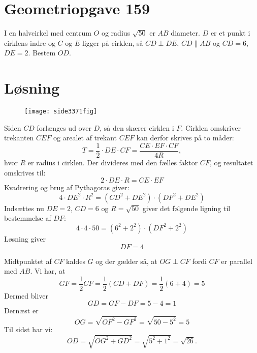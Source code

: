 \documentclass[12pt,oneside,a4paper]{article}
\begin{document}
\section*{Geometriopgave 159}
I en halvcirkel med centrum $O$ og radius $\sqrt{50}$ er $AB$ diameter. $D$ 
er et punkt i cirklens indre og $C$ og $E$ ligger på cirklen, så $CD \perp DE$, $CD \parallel AB$ og $CD=6$, $DE=2$. Bestem $OD$.


\section*{Løsning}
\begin{figure}[ht]
    \centering
    \texttt{[image: side3371fig]}
    \label{side3371fig}
\end{figure}

Siden $CD$ forlænges ud over $D$, så den skærer cirklen i $F$. Cirklen
omskriver trekanten $CEF$ og arealet af trekant $CEF$ kan derfor skrives på to
måder:
$$
T = \frac12 \cdot DE \cdot CF = \frac{CE\cdot EF\cdot CF}{4R},
$$
hvor $R$ er radius i cirklen.
Der divideres med den fælles faktor $CF$, og resultatet omskrives til:
$$
2 \cdot DE \cdot R = CE \cdot EF
$$
Kvadrering og brug af Pythagoras giver:
$$
4 \cdot DE^2 \cdot R^2 = (CD^2 + DE^2) \cdot (DF^2 + DE^2)
$$
Indsættes nu $DE = 2$, $CD = 6$ og $R = \sqrt{50}$ giver det følgende
ligning til bestemmelse af $DF$:
$$
4\cdot 4\cdot 50 = (6^2 + 2^2)\cdot(DF^2 + 2^2)
$$
Løsning giver
$$
DF = 4
$$

Midtpunktet af $CF$ kaldes $G$ og der gælder så, at $OG\perp CF$ fordi $CF$ er parallel med $AB$. Vi har,
at 
$$
GF = \frac12 CF = \frac12 (CD + DF) = \frac12 (6+4) = 5
$$
Dermed bliver 
$$
GD = GF - DF = 5 - 4 = 1
$$
Dernæst er 
$$
OG = \sqrt{OF^2 - GF^2} = \sqrt{50 - 5^2} = 5
$$
Til sidst har vi:
$$
OD = \sqrt{OG^2 + GD^2} = \sqrt{5^2 + 1^2} = \sqrt{26}.
$$
\end{document}
